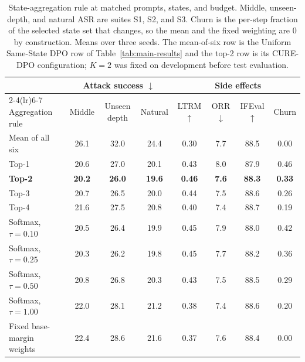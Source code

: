 \documentclass[11pt]{article}
\newcommand{\method}{CURE-DPO}
\newcommand{\ltrm}{LTRM}
\newcommand{\asr}{ASR}
\newcommand{\orr}{ORR}
\begin{document}
\begin{table}[t]
  \centering
  \footnotesize
  \setlength{\tabcolsep}{5pt}
  \begin{tabular}{lccccccc}
    \toprule
    & \multicolumn{3}{c}{Attack success \(\downarrow\)}
    & & \multicolumn{2}{c}{Side effects} & \\
    \cmidrule(lr){2-4}\cmidrule(lr){6-7}
    Aggregation rule & Middle & Unseen depth & Natural
    & \ltrm{} \(\uparrow\) & \orr{} \(\downarrow\) & IFEval \(\uparrow\)
    & Churn \\
    \midrule
    Mean of all six           & 26.1 & 32.0 & 24.4 & 0.30 & 7.7 & 88.5 & 0.00 \\
    \midrule
    Top-1                     & 20.6 & 27.0 & 20.1 & 0.43 & 8.0 & 87.9 & 0.46 \\
\textbf{Top-2}            & \textbf{20.2} & \textbf{26.0} & \textbf{19.6}
                              & \textbf{0.46} & \textbf{7.6} & \textbf{88.3}
                              & \textbf{0.33} \\
    Top-3                     & 20.7 & 26.5 & 20.0 & 0.44 & 7.5 & 88.6 & 0.26 \\
    Top-4                     & 21.6 & 27.5 & 20.8 & 0.40 & 7.4 & 88.7 & 0.19 \\
    \midrule
    Softmax, \(\tau=0.10\)    & 20.5 & 26.4 & 19.9 & 0.45 & 7.9 & 88.0 & 0.42 \\
    Softmax, \(\tau=0.25\)    & 20.3 & 26.2 & 19.8 & 0.45 & 7.7 & 88.2 & 0.36 \\
    Softmax, \(\tau=0.50\)    & 20.8 & 26.8 & 20.3 & 0.43 & 7.5 & 88.5 & 0.29 \\
    Softmax, \(\tau=1.00\)    & 22.0 & 28.1 & 21.2 & 0.38 & 7.4 & 88.6 & 0.20 \\
    \midrule
    Fixed base-margin weights & 22.4 & 28.6 & 21.6 & 0.37 & 7.6 & 88.4 & 0.00 \\
    \bottomrule
  \end{tabular}
  \caption{State-aggregation rule at matched prompts, states, and budget.
  Middle, unseen-depth, and natural \asr{} are suites S1, S2, and S3. Churn is
  the per-step fraction of the selected state set that changes, so the mean and
  the fixed weighting are \(0\) by construction. Means over three seeds. The
  mean-of-six row is the Uniform Same-State DPO row of
  Table~\ref{tab:main-results} and the top-2 row is its \method{}
  configuration; \(K=2\) was fixed on development before test
  evaluation.}
  \label{tab:aggregation}
\end{table}
\end{document}
